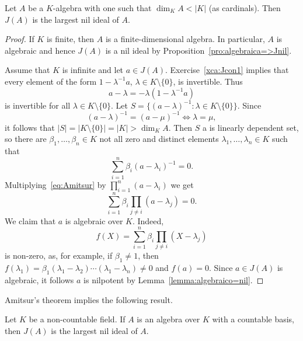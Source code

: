 \begin{theorem}[Amitsur]
	\label{thm:Amitsur}
	Let $A$ be a $K$-algebra with one such that $\dim_KA<|K|$ (as cardinals). Then 
	$J(A)$ is the largest nil ideal of $A$. 
\end{theorem}

\begin{proof}
	If $K$ is finite, then $A$ is a finite-dimensional algebra. In particular, $A$ is algebraic and
	hence $J(A)$ is a nil ideal by Proposition~\ref{pro:algebraica=>Jnil}.

	Assume that $K$ is infinite and let $a\in J(A)$. Exercise~\ref{xca:Jcon1} implies that 
	every element of the form 
	$1-\lambda^{-1}a$, $\lambda\in K\setminus\{0\}$, is invertible. Thus  
	\[
		a-\lambda=-\lambda(1-\lambda^{-1}a)
	\]
	is invertible for all $\lambda\in K\setminus\{0\}$. Let
	$S=\{(a-\lambda)^{-1}:\lambda\in K\setminus\{0\}\}$. Since 
	\[
	(a-\lambda)^{-1}=(a-\mu)^{-1}\Longleftrightarrow\lambda=\mu,
	\]
	it follows that $|S|=|K\setminus\{0\}|=|K|>\dim_KA$. Then $S$ a 
	is linearly dependent set, so there are $\beta_1,\dots,\beta_n\in K$
	not all zero and distinct elements $\lambda_1,\dots,\lambda_n\in K$ such that 
	\begin{equation}
		\label{eq:Amitsur}
		\sum_{i=1}^n \beta_i(a-\lambda_i)^{-1}=0.
	\end{equation}
	Multiplying~\eqref{eq:Amitsur} by $\prod_{i=1}^n(a-\lambda_i)$ we get 
	\[
		\sum_{i=1}^n\beta_i\prod_{j\ne i}(a-\lambda_j)=0.
	\]
	We claim that $a$ is algebraic over $K$. Indeed,  
	\[
		f(X)=\sum_{i=1}^n\beta_i\prod_{j\ne i}(X-\lambda_j)
	\]
	is non-zero, as, for example, if $\beta_1\ne1$, then  
	$f(\lambda_1)=\beta_1(\lambda_1-\lambda_2)\cdots(\lambda_1-\lambda_n)\ne0$
	and $f(a)=0$. Since $a\in J(A)$ is algebraic, it follows
	$a$ is nilpotent by Lemma~\ref{lemma:algebraico=nil}.
\end{proof}

Amitsur's theorem implies the following result. 

\begin{corollary}
Let $K$ be a non-countable field. If $A$ is an algebra
over $K$ with a countable basis, then 
$J(A)$ is the largest nil ideal of $A$.
\end{corollary}




